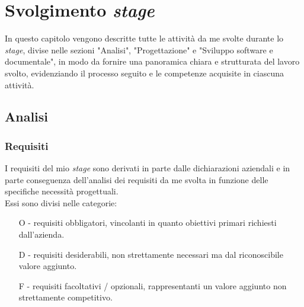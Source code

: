 \chapter{Svolgimento \emph{stage}}
\label{cap:svolgimentoStage}
In questo capitolo vengono descritte tutte le attività da me svolte durante lo \emph{stage}, divise nelle sezioni "Analisi", "Progettazione" e "Sviluppo software e documentale", in modo da fornire una panoramica chiara e strutturata del lavoro svolto, evidenziando il processo seguito e le competenze acquisite in ciascuna attività.\\
\section{Analisi}
\subsection{Requisiti}
I requisiti del mio \emph{stage} sono derivati in parte dalle dichiarazioni aziendali e in parte conseguenza dell'analisi dei requisiti da me svolta in funzione delle specifiche necessità progettuali.\\
Essi sono divisi nelle categorie:
\begin{enumerate}
	\item[O -]requisiti obbligatori, vincolanti in quanto obiettivi primari richiesti dall'azienda.
    \item[D -]requisiti desiderabili, non strettamente necessari ma dal riconoscibile valore aggiunto.
    \item[F -]requisiti facoltativi / opzionali, rappresentanti un valore aggiunto non strettamente competitivo.
\end{enumerate}

